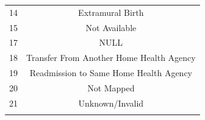 \documentclass[]{article}
\begin{document}
\begin{itemize}
\begin{longtable}[c]{@{}cc@{}}
  \begin{minipage}[t]{0.29\columnwidth}\centering\strut
  14
  \strut\end{minipage} &
  \begin{minipage}[t]{0.37\columnwidth}\centering\strut
  Extramural Birth
  \strut\end{minipage}\tabularnewline
  \begin{minipage}[t]{0.29\columnwidth}\centering\strut
  15
  \strut\end{minipage} &
  \begin{minipage}[t]{0.37\columnwidth}\centering\strut
  Not Available
  \strut\end{minipage}\tabularnewline
  \begin{minipage}[t]{0.29\columnwidth}\centering\strut
  17
  \strut\end{minipage} &
  \begin{minipage}[t]{0.37\columnwidth}\centering\strut
  NULL
  \strut\end{minipage}\tabularnewline
  \begin{minipage}[t]{0.29\columnwidth}\centering\strut
  18
  \strut\end{minipage} &
  \begin{minipage}[t]{0.37\columnwidth}\centering\strut
  Transfer From Another Home Health Agency
  \strut\end{minipage}\tabularnewline
  \begin{minipage}[t]{0.29\columnwidth}\centering\strut
  19
  \strut\end{minipage} &
  \begin{minipage}[t]{0.37\columnwidth}\centering\strut
  Readmission to Same Home Health Agency
  \strut\end{minipage}\tabularnewline
  \begin{minipage}[t]{0.29\columnwidth}\centering\strut
  20
  \strut\end{minipage} &
  \begin{minipage}[t]{0.37\columnwidth}\centering\strut
  Not Mapped
  \strut\end{minipage}\tabularnewline
  \begin{minipage}[t]{0.29\columnwidth}\centering\strut
  21
  \strut\end{minipage} &
  \begin{minipage}[t]{0.37\columnwidth}\centering\strut
  Unknown/Invalid
  \strut\end{minipage}\tabularnewline
  \begin{minipage}[t]{0.29\columnwidth}\centering\strut

\end{minipage}
\end{longtable}
\end{itemize}
\end{document}
